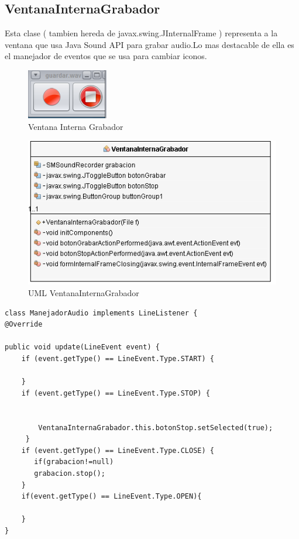 \subsection{VentanaInternaGrabador}
Esta clase ( tambien hereda de javax.swing.JInternalFrame ) representa a la ventana que usa Java Sound API para grabar audio.Lo mas destacable de ella es el manejador de eventos que se usa para cambiar iconos.
\begin{figure}[H]
  \centering
    \includegraphics[scale=0.60]{images/ventanainternagrabador}
  \caption{Ventana Interna Grabador}
  \label{Ventana Interna Grabador}
\end{figure}

\begin{figure}[H]
  \centering
    \includegraphics[scale=0.60]{images/ventanaInternaGrabador}
  \caption{UML VentanaInternaGrabador}
  \label{VentanaInternaGrabador}
\end{figure}

\begin{lstlisting}
class ManejadorAudio implements LineListener {
@Override

public void update(LineEvent event) {
    if (event.getType() == LineEvent.Type.START) {
      
    }
    if (event.getType() == LineEvent.Type.STOP) {
       
     
        VentanaInternaGrabador.this.botonStop.setSelected(true);
     }
    if (event.getType() == LineEvent.Type.CLOSE) {
       if(grabacion!=null) 
       grabacion.stop();
    }
    if(event.getType() == LineEvent.Type.OPEN){
        
    }
}
\end{lstlisting}
